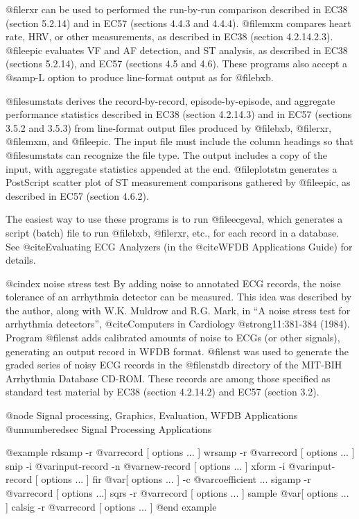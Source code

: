 {{{{{{{{{@file{rxr} can be used to performed the run-by-run comparison described in EC38
(section 5.2.14) and in EC57 (sections 4.4.3 and 4.4.4).  @file{mxm} compares
heart rate, HRV, or other measurements, as described in EC38 (section
4.2.14.2.3).  @file{epic} evaluates VF and AF detection, and ST analysis, as
described in EC38 (sections 5.2.14), and EC57 (sections 4.5 and 4.6).  These
programs also accept a @samp{-L} option to produce line-format output as for
@file{bxb}.

@file{sumstats} derives the record-by-record, episode-by-episode, and
aggregate performance statistics described in EC38 (section 4.2.14.3) and in
EC57 (sections 3.5.2 and 3.5.3) from line-format output files produced
by @file{bxb}, @file{rxr}, @file{mxm}, and @file{epic}.  The input file
must include the column headings so that @file{sumstats} can recognize
the file type.  The output includes a copy of the input, with aggregate
statistics appended at the end.  @file{plotstm} generates a PostScript
scatter plot of ST measurement comparisons gathered by @file{epic}, as
described in EC57 (section 4.6.2).

The easiest way to use these programs is to run @file{ecgeval}, which
generates a script (batch) file to run @file{bxb}, @file{rxr}, etc., for
each record in a database.  See @cite{Evaluating ECG Analyzers} (in the
@cite{WFDB Applications Guide}) for details.

@cindex noise stress test
By adding noise to annotated ECG records, the noise tolerance of an
arrhythmia detector can be measured.  This idea was described by the
author, along with W.K. Muldrow and R.G. Mark, in ``A noise stress test
for arrhythmia detectors'', @cite{Computers in Cardiology}
@strong{11}:381-384 (1984).  Program @file{nst} adds calibrated amounts
of noise to ECGs (or other signals), generating an output record in WFDB
format.  @file{nst} was used to generate the graded series of noisy ECG
records in the @file{nstdb} directory of the MIT-BIH Arrhythmia Database
CD-ROM.  These records are among those specified as standard test
material by EC38 (section 4.2.14.2) and EC57 (section 3.2).

@node     Signal processing, Graphics, Evaluation, WFDB Applications
@unnumberedsec Signal Processing Applications

@example
rdsamp -r @var{record [ options ... ]}
wrsamp -r @var{record [ options ... ]}
snip -i @var{input-record} -n @var{new-record [ options ... ]}
xform -i @var{input-record [ options ... ]}
fir @var{[ options ... ]} -c @var{coefficient ...}
sigamp -r @var{record [ options ...]}
sqrs -r @var{record [ options ... ]}
sample @var{[ options ... ]}
calsig -r @var{record [ options ... ]}
@end example

}}}}}}}}}
